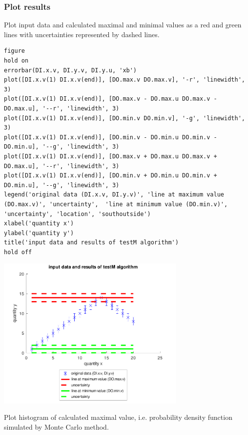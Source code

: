 {}
\subsubsection*{Plot results}



Plot input data and calculated maximal and minimal values as a red and green lines with
uncertainties represented by dashed lines.

\begin{lstlisting}
figure
hold on
errorbar(DI.x.v, DI.y.v, DI.y.u, 'xb')
plot([DI.x.v(1) DI.x.v(end)], [DO.max.v DO.max.v], '-r', 'linewidth', 3)
plot([DI.x.v(1) DI.x.v(end)], [DO.max.v - DO.max.u DO.max.v - DO.max.u], '--r', 'linewidth', 3)
plot([DI.x.v(1) DI.x.v(end)], [DO.min.v DO.min.v], '-g', 'linewidth', 3)
plot([DI.x.v(1) DI.x.v(end)], [DO.min.v - DO.min.u DO.min.v - DO.min.u], '--g', 'linewidth', 3)
plot([DI.x.v(1) DI.x.v(end)], [DO.max.v + DO.max.u DO.max.v + DO.max.u], '--r', 'linewidth', 3)
plot([DI.x.v(1) DI.x.v(end)], [DO.min.v + DO.min.u DO.min.v + DO.min.u], '--g', 'linewidth', 3)
legend('original data (DI.x.v, DI.y.v)', 'line at maximum value (DO.max.v)', 'uncertainty',  'line at minimum value (DO.min.v)', 'uncertainty', 'location', 'southoutside')
xlabel('quantity x')
ylabel('quantity y')
title('input data and results of testM algorithm')
hold off
\end{lstlisting}
\begin{center}
\includegraphics[width=0.7\textwidth]{algs_examples_published/testM_alg_example-1.pdf}
\end{center}


Plot histogram of calculated maximal value, i.e. probability density function simulated by Monte
Carlo method.

